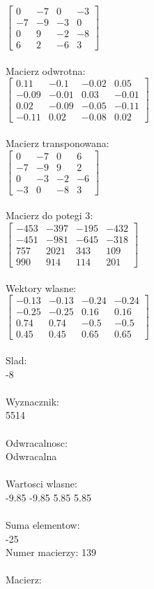 \documentclass[a4paper,12pt]{article}
\begin{document}
$\begin{bmatrix} 0&-7&0&-3\\-7&-9&-3&0\\0&9&-2&-8\\6&2&-6&3 \end{bmatrix}$
\\
\\
Macierz odwrotna:\\

$\begin{bmatrix} 0.11&-0.1&-0.02&0.05\\-0.09&-0.01&0.03&-0.01\\0.02&-0.09&-0.05&-0.11\\-0.11&0.02&-0.08&0.02 \end{bmatrix}$
\\
\\
Macierz transponowana:\\

$\begin{bmatrix} 0&-7&0&6\\-7&-9&9&2\\0&-3&-2&-6\\-3&0&-8&3 \end{bmatrix}$
\\
\\
Macierz do potegi 3:\\

$\begin{bmatrix} -453&-397&-195&-432\\-451&-981&-645&-318\\757&2021&343&109\\990&914&114&201 \end{bmatrix}$
\\
\\
Wektory wlasne:\\

$\begin{bmatrix} -0.13&-0.13&-0.24&-0.24\\-0.25&-0.25&0.16&0.16\\0.74&0.74&-0.5&-0.5\\0.45&0.45&0.65&0.65 \end{bmatrix}$
\\
\\
Slad:\\
-8
\\
\\
Wyznacznik:\\
5514
\\
\\
Odwracalnosc:\\
Odwracalna
\\
\\
Wartosci wlasne:\\
-9.85 -9.85 5.85 5.85
\\
\\
Suma elementow:\\
-25
\\
\newpage
Numer macierzy:
139
\\
\\
Macierz:\\
\end{document}
